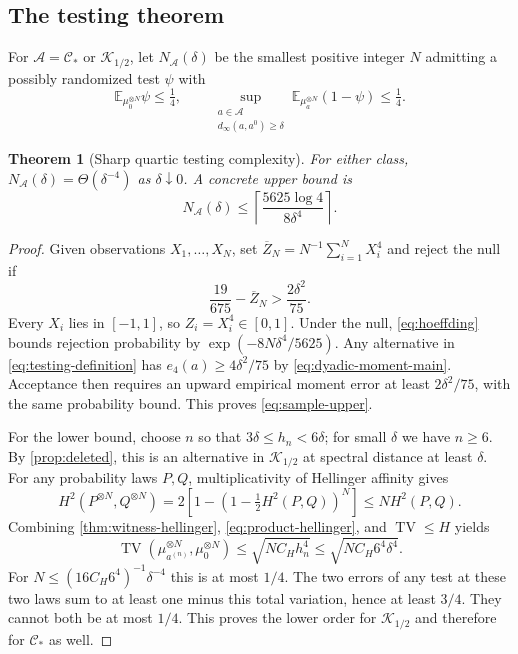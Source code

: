 \documentclass[11pt,a4paper]{article}
\numberwithin{equation}{section}
\newtheorem{theorem}{Theorem}[section]
\theoremstyle{definition}
\theoremstyle{remark}
\DeclareMathOperator{\TV}{TV}
\newcommand{\E}{\mathbb E}
\newcommand{\C}{\mathcal C}
\newcommand{\K}{\mathcal K}
\begin{document}
\subsection{The testing theorem}

For $\mathcal A=\C_*$ or $\K_{1/2}$, let $N_{\mathcal A}(\delta)$ be the
smallest positive integer $N$ admitting a possibly randomized test $\psi$
with
\begin{equation}
 \E_{\mu_0^{\otimes N}}\psi\le\tfrac14,
 \qquad
 \sup_{\substack{a\in\mathcal A\\d_\infty(a,a^0)\ge\delta}}
 \E_{\mu_a^{\otimes N}}(1-\psi)\le\tfrac14.
 \label{eq:testing-definition}
\end{equation}

\begin{theorem}[Sharp quartic testing complexity]
\label{thm:testing}
For either class, $N_{\mathcal A}(\delta)=\Theta(\delta^{-4})$ as
$\delta\downarrow0$. A concrete upper bound is
\begin{equation}
 N_{\mathcal A}(\delta)\le
 \left\lceil\frac{5625\log4}{8\delta^4}\right\rceil.
 \label{eq:sample-upper}
\end{equation}
\end{theorem}
\begin{proof}
Given observations $X_1,\ldots,X_N$, set
$\overline Z_N=N^{-1}\sum_{i=1}^NX_i^4$ and reject the null if
\begin{equation}
 \frac{19}{675}-\overline Z_N>\frac{2\delta^2}{75}.
 \label{eq:fourth-test}
\end{equation}
Every $X_i$ lies in $[-1,1]$, so $Z_i=X_i^4\in[0,1]$.
Under the null, \eqref{eq:hoeffding} bounds rejection probability by
$\exp(-8N\delta^4/5625)$. Any alternative in
\eqref{eq:testing-definition} has $e_4(a)\ge4\delta^2/75$ by
\eqref{eq:dyadic-moment-main}. Acceptance then requires an upward empirical
moment error at least $2\delta^2/75$, with the same probability bound.
This proves \eqref{eq:sample-upper}.

For the lower bound, choose $n$ so that $3\delta\le h_n<6\delta$;
for small $\delta$ we have $n\ge6$. By \cref{prop:deleted}, this is an
alternative in $\K_{1/2}$ at spectral distance at least $\delta$.
For any probability laws $P,Q$, multiplicativity of Hellinger affinity gives
\begin{equation}
 H^2(P^{\otimes N},Q^{\otimes N})
 =2\left[1-\left(1-\tfrac12H^2(P,Q)\right)^N\right]
 \le NH^2(P,Q).
 \label{eq:product-hellinger}
\end{equation}
Combining \cref{thm:witness-hellinger}, \eqref{eq:product-hellinger}, and
$\TV\le H$ yields
\[
 \TV(\mu_{a^{(n)}}^{\otimes N},\mu_0^{\otimes N})
 \le\sqrt{NC_Hh_n^4}\le\sqrt{NC_H6^4\delta^4}.
\]
For $N\le(16C_H6^4)^{-1}\delta^{-4}$ this is at most $1/4$.
The two errors of any test at these two laws sum to at least one minus
this total variation, hence at least $3/4$. They cannot both be at most
$1/4$. This proves the lower order for $\K_{1/2}$ and therefore for
$\C_*$ as well.
\end{proof}
\end{document}
